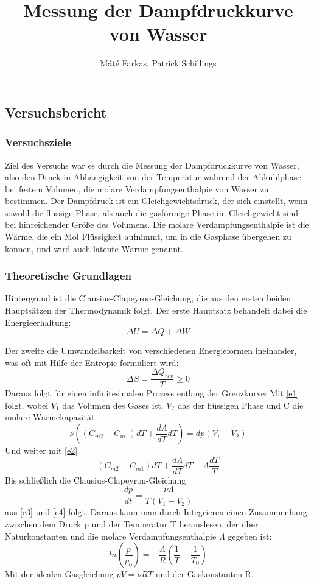 \documentclass[]{article}
\title{Messung der Dampfdruckkurve von Wasser}
\author{Máté Farkas, Patrick Schillings}
\begin{document}
	\begin{center}
		\part*{Versuchsbericht}
		\newpage
	\end{center}
\tableofcontents
\newpage
\section{Versuchsziele}
Ziel des Versuchs war es durch die Messung der Dampfdruckkurve von Wasser, also den Druck in Abhängigkeit von der Temperatur während der Abkühlphase bei festem Volumen, die molare Verdampfungsenthalpie von Wasser zu bestimmen. Der Dampfdruck ist ein Gleichgewichtsdruck, der sich einstellt, wenn sowohl die flüssige Phase, als auch die gasförmige Phase im Gleichgewicht sind bei hinreichender Größe des Volumens. Die molare Verdampfungsenthalpie ist die Wärme, die ein Mol Flüssigkeit aufnimmt, um in die Gasphase übergehen zu können, und wird auch latente Wärme genannt.
\section{Theoretische Grundlagen}
Hintergrund ist die Clausius-Clapeyron-Gleichung, die aus den ersten beiden Hauptsätzen der Thermodynamik folgt.
Der erste Hauptsatz behandelt dabei die Energieerhaltung:
\begin{equation}
	\Delta U =\Delta Q +\Delta W
	\label{e1}
\end{equation}

Der zweite die Umwandelbarkeit von verschiedenen Energieformen ineinander, was oft mit Hilfe der Entropie formuliert wird:
\begin{equation} 
 	 \Delta S=\frac{\Delta Q_{rev}}{T} \ge 0
 	 \label{e2}
 \end{equation}
Daraus folgt für einen infinitesimalen Prozess entlang der Grenzkurve:
Mit \ref{e1} folgt, wobei $V_1$ das Volumen des Gases ist, $V_2$ das der flüssigen Phase und C die molare Wärmekapazität
\begin{equation} 
 	 \nu((C_{m2}-C_{m1})dT+\frac{d\Lambda}{dT}dT)=dp(V_1-V_2)
 	 \label{e3} 
 \end{equation}
Und weiter mit \ref{e2}
\begin{equation} 
	(C_{m2}-C_{m1})dT+\frac{d\Lambda}{dT}dT-\Lambda\frac{dT}{T}
	\label{e4}
\end{equation}
Bis schließlich die Clausius-Clapeyron-Gleichung
\begin{equation} 
 	 \frac{dp}{dt}=\frac{\nu\Lambda}{T(V_1-V_2)} 
 \end{equation} aus \ref{e3} und \ref{e4} folgt.
Daraus kann man durch Integrieren einen Zusammenhang zwischen dem Druck p und der Temperatur T herauslesen, der über Naturkonstanten und die molare Verdampfungsenthalpie $\Lambda$ gegeben ist:
\begin{equation}
	ln(\frac{p}{p_0})=-\frac{\Lambda}{R}(\frac{1}{T}-\frac{1}{T_0})
\end{equation}
Mit der idealen Gasgleichung $pV=\nu RT$ und der Gaskonstanten R.
\end{document}
